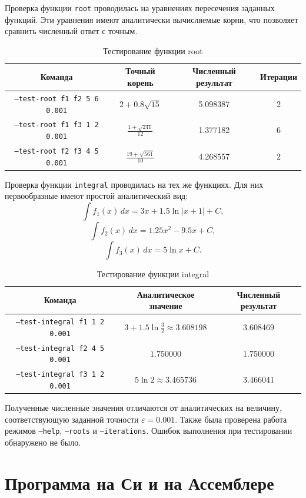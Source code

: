 \documentclass[a4paper,12pt,titlepage,finall]{article}
\begin{document}
Проверка функции \texttt{root} проводилась на уравнениях пересечения заданных функций. Эти уравнения имеют аналитически вычисляемые корни, что позволяет сравнить численный ответ с точным.

\begin{table}[h]
\centering
\begin{tabular}{|c|c|c|c|}
\hline
Команда & Точный корень & Численный результат & Итерации \\
\hline
\texttt{--test-root f1 f2 5 6 0.001} & \(2+0.8\sqrt{15}\) & 5.098387 & 2 \\
\texttt{--test-root f1 f3 1 2 0.001} & \(\frac{1+\sqrt{241}}{12}\) & 1.377182 & 6 \\
\texttt{--test-root f2 f3 4 5 0.001} & \(\frac{19+\sqrt{561}}{10}\) & 4.268557 & 2 \\
\hline
\end{tabular}
\caption{Тестирование функции root}
\end{table}

Проверка функции \texttt{integral} проводилась на тех же функциях. Для них первообразные имеют простой аналитический вид:
\[
    \int f_1(x)\,dx=3x+1.5\ln|x+1|+C,
\]
\[
    \int f_2(x)\,dx=1.25x^2-9.5x+C,
\]
\[
    \int f_3(x)\,dx=5\ln x+C.
\]

\begin{table}[h]
\centering
\begin{tabular}{|c|c|c|}
\hline
Команда & Аналитическое значение & Численный результат \\
\hline
\texttt{--test-integral f1 1 2 0.001} & \(3+1.5\ln\frac{3}{2}\approx 3.608198\) & 3.608469 \\
\texttt{--test-integral f2 4 5 0.001} & \(1.750000\) & 1.750000 \\
\texttt{--test-integral f3 1 2 0.001} & \(5\ln2\approx 3.465736\) & 3.466041 \\
\hline
\end{tabular}
\caption{Тестирование функции integral}
\end{table}

Полученные численные значения отличаются от аналитических на величину, соответствующую заданной точности \(\varepsilon=0.001\). Также была проверена работа режимов \texttt{--help}, \texttt{--roots} и \texttt{--iterations}. Ошибок выполнения при тестировании обнаружено не было.

\newpage

\section{Программа на Си и на Ассемблере}
\end{document}
